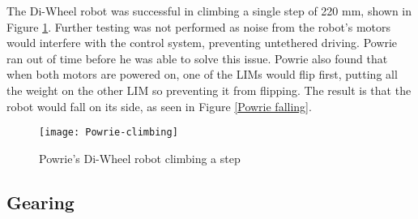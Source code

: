 The Di-Wheel robot was successful in climbing a single step of 220 mm, shown in Figure \ref{Powrie climbing}. Further testing was not performed as noise from the robot's motors would interfere with the control system, preventing untethered driving. Powrie ran out of time before he was able to solve this issue. Powrie also found that when both motors are powered on, one of the LIMs would flip first, putting all the weight on the other LIM so preventing it from flipping. The result is that the robot would fall on its side, as seen in Figure \ref{Powrie falling}.\\


\newpage

\begin{figure}[h]
	\centering
	\texttt{[image: Powrie-climbing]}
	\caption{Powrie's Di-Wheel robot climbing a step \citep{Powrie-2019}}
	\label{Powrie climbing}
\end{figure}

\newpage

\subsection{Gearing} %



